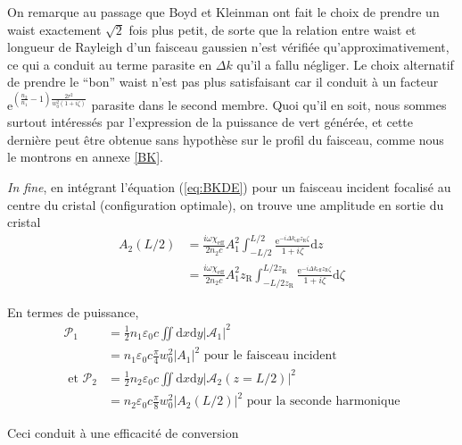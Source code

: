 \documentclass[11pt,a4paper] { article}
\newcommand{\zr}{z_\mathsc{R}}
\renewcommand{\P}{\mathscr{P}}
\newcommand{\A}{\mathcal{A}}
\newcommand{\e}[1]{\text{e}^{#1}}
\newcommand{\mathsc}[1]{\mathrm{\scriptscriptstyle {#1}}}
\begin{document}
On remarque au passage que Boyd et Kleinman ont fait le choix de prendre un waist exactement $\sqrt{2}$ fois plus petit, de sorte que la relation entre waist et longueur de Rayleigh d'un faisceau gaussien n'est vérifiée qu'approximativement, ce qui a conduit au terme parasite en $\Delta k$ qu'il a fallu négliger. Le choix alternatif de prendre le ``bon'' waist n'est pas plus satisfaisant car il conduit à un facteur $\e{ \left(\frac{n_2}{n_1}-1\right) \frac{2 r^2}{w_0^2(1+i\zeta)}}$ parasite dans le second membre. Quoi qu'il en soit, nous sommes surtout intéressés par l'expression de la puissance de vert générée, et cette dernière peut être obtenue sans hypothèse sur le profil du faisceau, comme nous le montrons en annexe \ref{BK}. 

\textit{In fine}, en intégrant l'équation (\ref{eq:BKDE}) pour un faisceau incident focalisé au centre du cristal (configuration optimale), on trouve une amplitude en sortie du cristal
\begin{align*} 
	A_2(L/2) &= \frac{i\omega \chi_\mathsc{eff}}{2 n_2 c} A_1^2 \int_{-L/2}^{L/2} \frac{\e{-i\Delta k_\mathsc{eff} \zr \zeta}}{1+i\zeta} \mathrm dz \\
	&= \frac{i\omega \chi_\mathsc{eff}}{2 n_2 c} A_1^2 \zr \int_{-L/2\zr}^{L/2\zr} \frac{\e{-i\Delta k_\mathsc{eff} \zr \zeta}}{1+i\zeta} \mathrm d\zeta
\end{align*}

En termes de puissance,
\begin{align*} 
	\P_1 &= \frac12 n_1 \varepsilon_0 c \iint \mathrm dx \mathrm dy |\A_1|^2 \\
	&= n_1\varepsilon_0c \frac\pi4 w_0^2 |A_1|^2 \text{ pour le faisceau incident } \\
	\text{ et } \P_2 &= \frac12 n_2 \varepsilon_0 c \iint \mathrm dx \mathrm dy |\A_2(z=L/2)|^2 \\
	&= n_2\varepsilon_0c \frac\pi8 w_0^2 |A_2(L/2)|^2 \text{ pour la seconde harmonique}
\end{align*}

Ceci conduit à une efficacité de conversion
\end{document}

